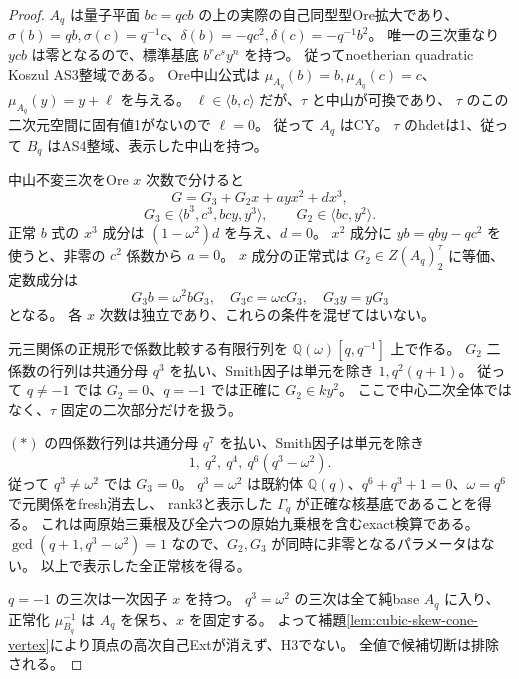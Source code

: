 \begin{proof}
$A_q$ は量子平面 $bc=qcb$ の上の実際の自己同型型Ore拡大であり、
$\sigma(b)=qb,\sigma(c)=q^{-1}c$、$\delta(b)=-qc^2,\delta(c)=-q^{-1}b^2$。
唯一の三次重なり $ycb$ は零となるので、標準基底 $b^rc^sy^n$ を持つ。
従ってnoetherian quadratic Koszul AS3整域である。
Ore中山公式は $\mu_{A_q}(b)=b,\mu_{A_q}(c)=c$、$\mu_{A_q}(y)=y+\ell$ を与える。
$\ell\in\langle b,c\rangle$ だが、$\tau$ と中山が可換であり、
$\tau$ のこの二次元空間に固有値1がないので $\ell=0$。
従って $A_q$ はCY。
$\tau$ のhdetは1、従って $B_q$ はAS4整域、表示した中山を持つ。

中山不変三次をOre $x$ 次数で分けると
\[
 G=G_3+G_2x+a yx^2+d x^3,
\]
\[
 G_3\in\langle b^3,c^3,bcy,y^3\rangle,\qquad
 G_2\in\langle bc,y^2\rangle.
\]
正常 $b$ 式の $x^3$ 成分は $(1-\omega^2)d$ を与え、$d=0$。
$x^2$ 成分に $yb=qby-qc^2$ を使うと、非零の $c^2$ 係数から $a=0$。
$x$ 成分の正常式は $G_2\in Z(A_q)_2^\tau$ に等価、定数成分は
\[
 G_3b=\omega^2bG_3,\quad G_3c=\omega cG_3,\quad G_3y=yG_3
\tag{*}
\]
となる。
各 $x$ 次数は独立であり、これらの条件を混ぜてはいない。

元三関係の正規形で係数比較する有限行列を $\mathbb Q(\omega)[q,q^{-1}]$ 上で作る。
$G_2$ 二係数の行列は共通分母 $q^3$ を払い、Smith因子は単元を除き
$1,q^2(q+1)$。
従って $q\ne-1$ では $G_2=0$、$q=-1$ では正確に $G_2\in ky^2$。
ここで中心二次全体ではなく、$\tau$ 固定の二次部分だけを扱う。

$(*)$ の四係数行列は共通分母 $q^7$ を払い、Smith因子は単元を除き
\[
 1,\ q^2,\ q^4,\ q^6(q^3-\omega^2).
\]
従って $q^3\ne\omega^2$ では $G_3=0$。
$q^3=\omega^2$ は既約体 $\mathbb Q(q)$、$q^6+q^3+1=0$、$\omega=q^6$ で元関係をfresh消去し、
rank3と表示した $\Gamma_q$ が正確な核基底であることを得る。
これは両原始三乗根及び全六つの原始九乗根を含むexact検算である。
$\gcd(q+1,q^3-\omega^2)=1$ なので、$G_2,G_3$ が同時に非零となるパラメータはない。
以上で表示した全正常核を得る。

$q=-1$ の三次は一次因子 $x$ を持つ。
$q^3=\omega^2$ の三次は全て純base $A_q$ に入り、
正常化 $\mu_{B_q}^{-1}$ は $A_q$ を保ち、$x$ を固定する。
よって補題\ref{lem:cubic-skew-cone-vertex}により頂点の高次自己Extが消えず、H3でない。
全値で候補切断は排除される。
\end{proof}
